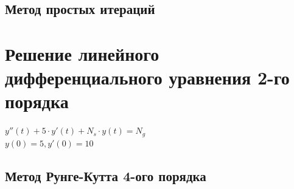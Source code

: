 \documentclass{article}
\begin{document}
\subsection{Метод простых итераций}

\section{Решение линейного дифференциального уравнения 2-го порядка}
$y''(t) + 5\cdot y'(t) + N_s \cdot y(t) = N_g$ \\
$y(0) = 5, y'(0) =10$

\subsection{Метод Рунге-Кутта 4-ого порядка}
\end{document}
